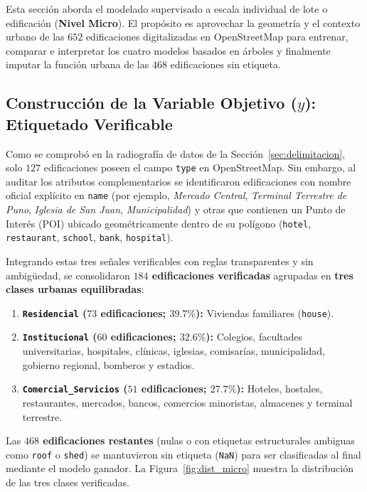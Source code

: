 \documentclass[11pt,a4paper]{article}
\begin{document}
Esta sección aborda el modelado supervisado a escala individual de lote o edificación (\textbf{Nivel Micro}). El propósito es aprovechar la geometría y el contexto urbano de las $652$ edificaciones digitalizadas en OpenStreetMap para entrenar, comparar e interpretar los cuatro modelos basados en árboles y finalmente imputar la función urbana de las $468$ edificaciones sin etiqueta.

\subsection{Construcción de la Variable Objetivo ($y$): Etiquetado Verificable}

Como se comprobó en la radiografía de datos de la Sección~\ref{sec:delimitacion}, solo $127$ edificaciones poseen el campo \texttt{type} en OpenStreetMap. Sin embargo, al auditar los atributos complementarios se identificaron edificaciones con nombre oficial explícito en \texttt{name} (por ejemplo, \textit{Mercado Central}, \textit{Terminal Terrestre de Puno}, \textit{Iglesia de San Juan}, \textit{Municipalidad}) y otras que contienen un Punto de Interés (POI) ubicado geométricamente dentro de su polígono (\texttt{hotel}, \texttt{restaurant}, \texttt{school}, \texttt{bank}, \texttt{hospital}).

Integrando estas tres señales verificables con reglas transparentes y sin ambigüedad, se consolidaron \textbf{$184$ edificaciones verificadas} agrupadas en \textbf{tres clases urbanas equilibradas}:
\begin{enumerate}[leftmargin=0.85cm, itemsep=2pt]
    \item \textbf{\texttt{Residencial} ($73$ edificaciones; $39.7\%$):} Viviendas familiares (\texttt{house}).
    \item \textbf{\texttt{Institucional} ($60$ edificaciones; $32.6\%$):} Colegios, facultades universitarias, hospitales, clínicas, iglesias, comisarías, municipalidad, gobierno regional, bomberos y estadios.
    \item \textbf{\texttt{Comercial\_Servicios} ($51$ edificaciones; $27.7\%$):} Hoteles, hostales, restaurantes, mercados, bancos, comercios minoristas, almacenes y terminal terrestre.
\end{enumerate}

Las \textbf{$468$ edificaciones restantes} (nulas o con etiquetas estructurales ambiguas como \texttt{roof} o \texttt{shed}) se mantuvieron sin etiqueta (\texttt{NaN}) para ser clasificadas al final mediante el modelo ganador. La Figura~\ref{fig:dist_micro} muestra la distribución de las tres clases verificadas.
\end{document}
